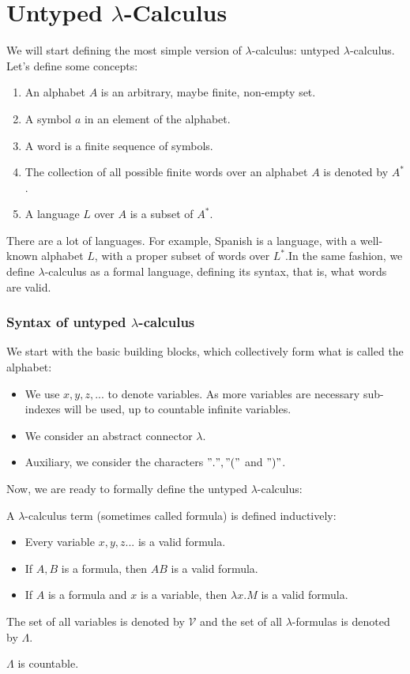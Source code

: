 \section{Untyped $\lambda$-Calculus }
We will start defining the most simple version of $\lambda$-calculus: untyped $\lambda$-calculus. Let's define some concepts:


\begin{enumerate}
\item An alphabet $A$ is an arbitrary, maybe finite, non-empty set.
\item A symbol $a$ in an element of the alphabet.
\item A word is a finite sequence of symbols.
\item The collection of all possible finite words over an alphabet $A$ is denoted by $A^*$.
\item A language $L$ over $A$  is a subset of $A^*.$
\end{enumerate}

There are a lot of languages. For example, Spanish is a language, with a well-known alphabet $L$, with a proper subset of words over $L^*$.In the same fashion, we define $\lambda$-calculus as a formal language, defining its syntax, that is, what words are valid.


\subsubsection{Syntax of untyped $\lambda$-calculus}
We start with the basic building blocks, which collectively form what is
called the alphabet:

\begin{itemize}
\item We use $x, y, z,...$ to denote variables. As more variables are necessary sub-indexes will be used, up to countable infinite variables.
\item We consider an abstract connector $\lambda$.
  \item Auxiliary, we consider the characters $".", "("$ and $")"$.
\end{itemize}
Now, we are ready to formally define the untyped $\lambda$-calculus:

\begin{definition}\label{def:untyped-lambda-calc}
  A $\lambda$-calculus term (sometimes called formula) is defined inductively:
  \begin{itemize}
  \item Every variable $x,y,z...$ is a valid formula.
  \item If $A,B$ is a formula, then $AB$ is a valid formula.
  \item If $A$ is a formula and $x$ is a variable, then $\lambda x.M$ is a valid formula.
  \end{itemize}
  The set of all variables is denoted by $\mathcal{V}$ and the set of all $\lambda$-formulas is denoted by $\Lambda$.
\end{definition}
\begin{remark}
  $\Lambda$ is countable.
\end{remark}

